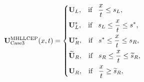 \documentclass[review]{elsarticle}
\begin{document}
 \begin{equation}\label{eq:HLLCEP3}
   \mathbf{U}^{\text{MHLLCEP}}_{\text{Case3}}(x,t) = \left\{ \begin{aligned}
        & \mathbf{U}_L, \hspace{0.3cm} \text{if} \hspace{0.3cm} \frac{x}{t}\le s_L, \\
        & \mathbf{U}_L^*, \hspace{0.3cm} \text{if} \hspace{0.3cm} s_L \le \frac{x}{t} \le s^*, \\
        & \mathbf{U}_R^*, \hspace{0.3cm} \text{if} \hspace{0.3cm} s^*\le \frac{x}{t} \le s_R, \\
        & \widetilde{\mathbf{U}}_R, \hspace{0.3cm} \text{if} \hspace{0.3cm} s_R \le \frac{x}{t} \le \widetilde{s}_R,\\
        & \mathbf{U}_R, \hspace{0.3cm} \text{if} \hspace{0.3cm} \frac{x}{t}\ge \widetilde{s}_R, \\
      \end{aligned}
    \right.
  \end{equation}
\end{document}
